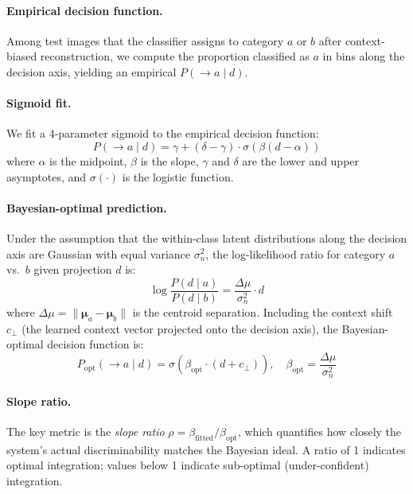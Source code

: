 \documentclass[11pt,a4paper]{article}
\begin{document}
\paragraph{Empirical decision function.}
Among test images that the classifier assigns to category $a$ or $b$ after context-biased reconstruction, we compute the proportion classified as $a$ in bins along the decision axis, yielding an empirical $P(\to a \mid d)$.

\paragraph{Sigmoid fit.}
We fit a 4-parameter sigmoid to the empirical decision function:
\begin{equation}
    P(\to a \mid d) = \gamma + (\delta - \gamma) \cdot \sigma(\beta(d - \alpha))
    \label{eq:sigmoid}
\end{equation}
where $\alpha$ is the midpoint, $\beta$ is the slope, $\gamma$ and $\delta$ are the lower and upper asymptotes, and $\sigma(\cdot)$ is the logistic function.

\paragraph{Bayesian-optimal prediction.}
Under the assumption that the within-class latent distributions along the decision axis are Gaussian with equal variance $\sigma_n^2$, the log-likelihood ratio for category $a$ vs.\ $b$ given projection $d$ is:
\begin{equation}
    \log \frac{P(d \mid a)}{P(d \mid b)} = \frac{\Delta\mu}{\sigma_n^2} \cdot d
\end{equation}
where $\Delta\mu = \|\boldsymbol{\mu}_a - \boldsymbol{\mu}_b\|$ is the centroid separation.
Including the context shift $c_\perp$ (the learned context vector projected onto the decision axis), the Bayesian-optimal decision function is:
\begin{equation}
    P_\text{opt}(\to a \mid d) = \sigma\!\left(\beta_\text{opt} \cdot (d + c_\perp)\right), \quad \beta_\text{opt} = \frac{\Delta\mu}{\sigma_n^2}
    \label{eq:bayesian_optimal}
\end{equation}

\paragraph{Slope ratio.}
The key metric is the \emph{slope ratio} $\rho = \beta_\text{fitted} / \beta_\text{opt}$, which quantifies how closely the system's actual discriminability matches the Bayesian ideal.
A ratio of 1 indicates optimal integration; values below 1 indicate sub-optimal (under-confident) integration.
\end{document}

